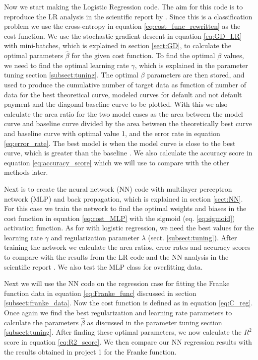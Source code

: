 \documentclass[12pt,a4paper,english]{article}
\begin{document}
Now we start making the Logistic Regression code. The aim for this code is to reproduce the LR analysis in the scientific report by \citet{origarticle}. Since this is a classification problem we use the cross-entropy in equation \ref{eq:cost_func_rewritten} as the cost function. We use the stochastic gradient descent in equation \ref{eq:GD_LR} with mini-batches, which is explained in section \ref{sect:GD}, to calculate the optimal parameters $\hat{\beta}$ for the given cost function. To find the optimal $\beta$ values, we need to find the optimal learning rate $\gamma$, which is explained in the parameter tuning section \ref{subsect:tuning}. The optimal $\beta$ parameters are then stored, and used to produce the cumulative number of target data as function of number of data for the best theoretical curve, modeled curves for default and not default payment and the diagonal baseline curve to be plotted. With this we also calculate the area ratio for the two model cases as the area between the model curve and baseline curve divided by the area between the theoretically best curve and baseline curve with optimal value 1, and the error rate in equation \ref{eq:error_rate}. The best model is when the model curve is close to the best curve, which is greater than the baseline \cite{origarticle}. We also calculate the accuracy score in equation \ref{eq:accuracy_score} which we will use to compare with the other methods later.

Next is to create the neural network (NN) code with multilayer perceptron network (MLP) and back propagation, which is explained in section \ref{sect:NN}. For this case we train the network to find the optimal weights and biases in the cost function in equation \ref{eq:cost_MLP} with the sigmoid (eq. \ref{eq:sigmoid}) activation function. As for with logistic regression, we need the best values for the learning rate $\gamma$ and regularization parameter $\lambda$ (sect. \ref{subsect:tuning}). After training the network we calculate the area ratios, error rates and accuracy scores to compare with the results from the LR code and the NN analysis in the scientific report \cite{origarticle}. We also test the MLP class for overfitting data.

Next we will use the NN code on the regression case for fitting the Franke function data in equation \ref{eq:Franke_func} discussed in section \ref{subsect:franke_data}. Now the cost function is defined as in equation \ref{eq:C_reg}. Once again we find the best regularization and learning rate parameters to calculate the parameters $\hat{\beta}$ as discussed in the parameter tuning section \ref{subsect:tuning}. After finding these optimal parameters, we now calculate the $R^2$ score in equation \ref{eq:R2_score}. We then compare our NN regression results with the results obtained in project 1 \cite{proj1} for the Franke function.
\end{document}
